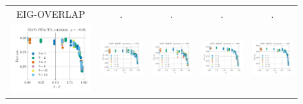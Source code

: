 \begin{figure}
	\centering
	\begin{tabular}{@{\hskip -0.0in}c@{\hskip -0.0in}c@{\hskip -0.0in}c@{\hskip -0.0in}c@{\hskip -0.0in}c@{\hskip -0.0in}}
		EIG-OVERLAP & . & . & . & .\\
		\includegraphics[width=.2\linewidth]{figures/glove-wiki400k-am_sentiment_mr_test-acc_vs_subspace-eig-overlap_linx.pdf} &
		\includegraphics[width=.2\linewidth]{figures/glove-wiki400k-am_sentiment_subj_test-acc_vs_subspace-eig-overlap_linx.pdf} &
		\includegraphics[width=.2\linewidth]{figures/glove-wiki400k-am_sentiment_cr_test-acc_vs_subspace-eig-overlap_linx.pdf} &
		\includegraphics[width=.2\linewidth]{figures/glove-wiki400k-am_sentiment_sst_test-acc_vs_subspace-eig-overlap_linx.pdf} &
		\includegraphics[width=.2\linewidth]{figures/glove-wiki400k-am_sentiment_mpqa_test-acc_vs_subspace-eig-overlap_linx.pdf} \\
		

\end{tabular}
\end{figure}
